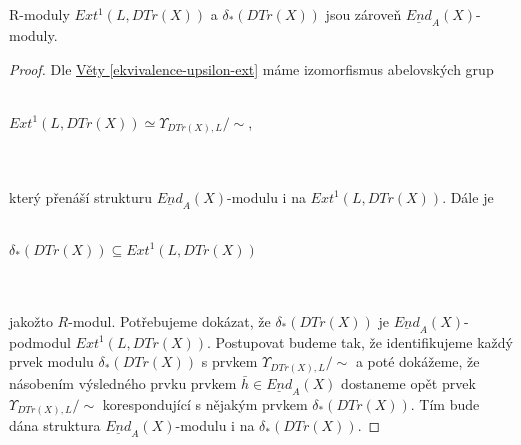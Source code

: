         \begin{lem}\label{lem-ext-delta-jsou-moduly}
          R-moduly $Ext^1(L,DTr(X))$ a $\delta_*(DTr(X))$ jsou zároveň $\underline{End}_A(X)$-moduly. 
        \end{lem}
        \begin{proof}
          Dle \hyperref[ekvivalence-upsilon-ext]{Věty \ref*{ekvivalence-upsilon-ext}} máme izomorfismus 
          abelovských grup \\\\ 
          \centerline{$Ext^1(L,DTr(X))\simeq \Upsilon_{DTr(X),L}/\sim $,} \\\\
           který přenáší strukturu 
          $\underline{End}_A(X)$-modulu i na $Ext^1(L,DTr(X))$.          
          Dále je \\\\
          \centerline{$\delta_*(DTr(X)) \subseteq Ext^1(L,DTr(X))$}\\\\
           jakožto $R$-modul. Potřebujeme dokázat, že 
          $\delta_*(DTr(X))$ je $\underline{End}_A(X)$-podmodul 
          $Ext^1(L,DTr(X))$. Postupovat budeme tak, že identifikujeme každý 
          prvek modulu $\delta_*(DTr(X))$ s prvkem $\Upsilon_{DTr(X),L}/\sim$ a poté 
          dokážeme, že násobením výsledného prvku prvkem $\bar{h}\in\underline{End}_A(X)$ 
          dostaneme opět prvek $\Upsilon_{DTr(X),L}/\sim$ korespondující s nějakým prvkem 
          $\delta_*(DTr(X))$. Tím bude dána struktura $\underline{End}_A(X)$-modulu 
          i na $\delta_*(DTr(X))$.
            

\end{proof}
